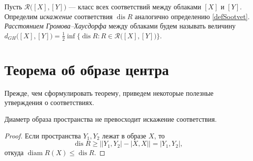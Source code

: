 \documentclass[11pt,twoside,draft
]{article}
\DeclareMathOperator{\dis}{dis}
\DeclareMathOperator{\diam}{diam}
\begin{document}
\begin{defin}
	Пусть $\mathcal{R}\big([X],[Y]\big)$ --- класс всех соответствий между
	облаками $[X]$ и $[Y]$. Определим \emph{искажение} соответствия $\dis R$
	аналогично определению \ref{defSootvet}. \emph{Расстоянием Громова--Хаусдорфа} между облаками
	будем называть величину
	$d_{GH}\big([X],[Y]\big) = \frac{1}{2}\inf\bigl\{\dis R : R\in \mathcal{R}\big([X],[Y]\big)\bigr\}$.
\end{defin}


\section{Теорема об образе центра}
Прежде, чем сформулировать теорему, приведем некоторые полезные
утверждения о соответствиях.
\begin{lemma}
	Диаметр образа пространства не превосходит
	искажение соответствия.
	\label{lemDiamImage}
\end{lemma}
\begin{proof}
	Если пространства $Y_{1}, Y_{2}$ лежат в образе $X$, то
	\[\dis R \ge \big|\left|Y_{1},Y_{2}\right| - \left|X,X\right|\big| = |Y_{1}, Y_{2}|,\]
	откуда $\diam R(X) \le \dis R$.
\end{proof}
\end{document}
